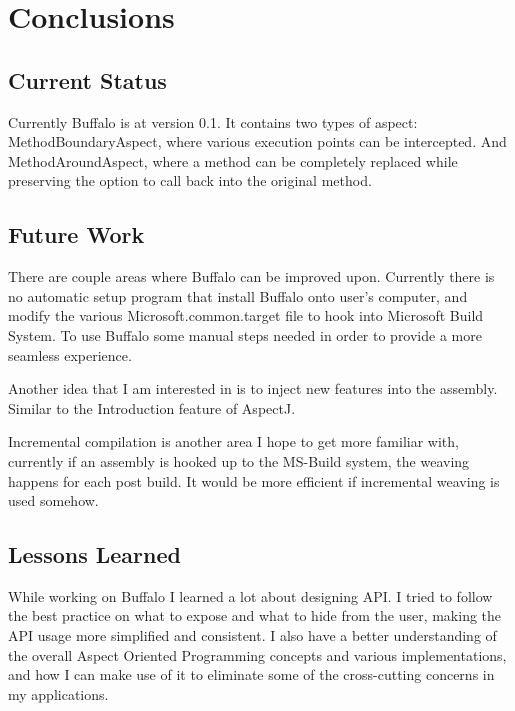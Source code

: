 \chapter{Conclusions}
\section{Current Status}

Currently Buffalo is at version 0.1. It contains two types of aspect: MethodBoundaryAspect, where various execution points can be intercepted. And MethodAroundAspect, where a method can be completely replaced while preserving the option to call back into the original method.

\section{Future Work}

There are couple areas where Buffalo can be improved upon. Currently there is no automatic setup program that install Buffalo onto user’s computer, and modify the various Microsoft.common.target file to hook into Microsoft Build System. To use Buffalo some manual steps needed in order to provide a more seamless experience.

Another idea that I am interested in is to inject new features into the assembly. Similar to the Introduction feature of AspectJ.

Incremental compilation is another area I hope to get more familiar with, currently if an assembly is hooked up to the MS-Build system, the weaving happens for each post build. It would be more efficient if incremental weaving is used somehow.

\section{Lessons Learned}

While working on Buffalo I learned a lot about designing API. I tried to follow the best practice on what to expose and what to hide from the user, making the API usage more simplified and consistent. I also have a better understanding of the overall Aspect Oriented Programming concepts and various implementations, and how I can make use of it to eliminate some of the cross-cutting concerns in my applications.
